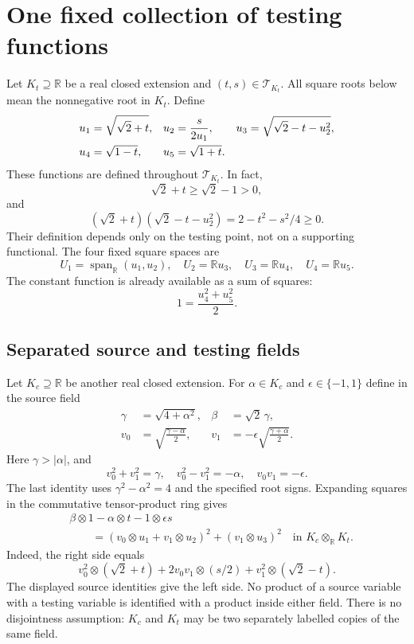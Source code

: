 \documentclass[11pt]{article}
\newcommand{\R}{\mathbb R}
\newcommand{\T}{\mathcal T}
\begin{document}
\section{One fixed collection of testing functions}
Let $K_t\supseteq\R$ be a real closed extension and $(t,s)\in\T_{K_t}$. All square roots below mean the nonnegative root in $K_t$. Define
\begin{align}\label{eq:features}
 u_1&=\sqrt{\sqrt2+t},&
 u_2&=\frac{s}{2u_1},&
 u_3&=\sqrt{\sqrt2-t-u_2^2},\\
 u_4&=\sqrt{1-t},&u_5&=\sqrt{1+t}.&&\notag
\end{align}
These functions are defined throughout $\T_{K_t}$. In fact,
\[
 \sqrt2+t\ge\sqrt2-1>0,
\]
and
\[
 (\sqrt2+t)(\sqrt2-t-u_2^2)=2-t^2-s^2/4\ge0.
\]
Their definition depends only on the testing point, not on a supporting functional. The four fixed square spaces are
\[
 U_1=\operatorname{span}_{\R}(u_1,u_2),\quad
 U_2=\R u_3,\quad U_3=\R u_4,\quad U_4=\R u_5.
\]
The constant function is already available as a sum of squares:
\begin{equation}\label{eq:constant}
 1=\frac{u_4^2+u_5^2}{2}.
\end{equation}

\subsection{Separated source and testing fields}
Let $K_c\supseteq\R$ be another real closed extension. For $\alpha\in K_c$ and $\epsilon\in\{-1,1\}$ define in the source field
\begin{align*}
 \gamma&=\sqrt{4+\alpha^2},&\beta&=\sqrt2\,\gamma,\\
 v_0&=\sqrt{\frac{\gamma-\alpha}{2}},&
 v_1&=-\epsilon\sqrt{\frac{\gamma+\alpha}{2}}.
\end{align*}
Here $\gamma>|\alpha|$, and
\[
 v_0^2+v_1^2=\gamma,\quad v_0^2-v_1^2=-\alpha,
 \quad v_0v_1=-\epsilon.
\]
The last identity uses $\gamma^2-\alpha^2=4$ and the specified root signs. Expanding squares in the commutative tensor-product ring gives
\begin{equation}\label{eq:tensor-sos}
 \begin{aligned}
 &\beta\otimes1-\alpha\otimes t-1\otimes\epsilon s\\
 &\qquad=(v_0\otimes u_1+v_1\otimes u_2)^2
                 +(v_1\otimes u_3)^2
       \quad\text{in }K_c\otimes_{\R}K_t.
 \end{aligned}
\end{equation}
Indeed, the right side equals
\[
 v_0^2\otimes(\sqrt2+t)+2v_0v_1\otimes(s/2)
       +v_1^2\otimes(\sqrt2-t).
\]
The displayed source identities give the left side. No product of a source variable with a testing variable is identified with a product inside either field. There is no disjointness assumption: $K_c$ and $K_t$ may be two separately labelled copies of the same field.
\end{document}
